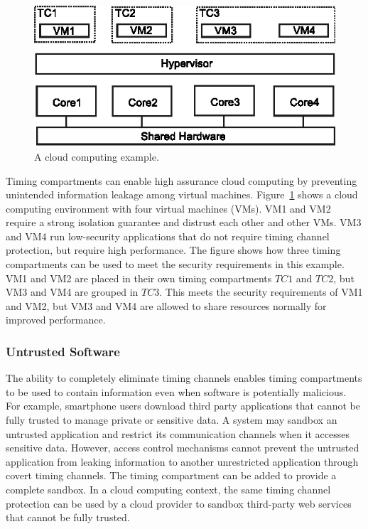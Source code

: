 \begin{figure}
    \begin{center}
        \includegraphics{figs/cloud_tcs.eps}
        \caption{A cloud computing example.} %
        \label{fig:cloud_tcs}
        \vspace{-0.2in}
    \end{center}
\end{figure}

Timing compartments can enable high assurance cloud computing by preventing
unintended information leakage among virtual machines.
Figure~\ref{fig:cloud_tcs} shows a cloud computing environment with four virtual 
machines (VMs).
VM1 and VM2 require a strong isolation guarantee and distrust each other and 
other VMs.
VM3 and VM4 run low-security applications that do not require timing channel 
protection, but require high performance. The figure shows how three timing 
compartments can be used to meet the security requirements in this example.
VM1 and VM2 are placed in their own timing compartments $TC1$ and $TC2$, but VM3 
and VM4 are grouped in $TC3$. 
This meets the 
security requirements of VM1 and VM2, but VM3 and VM4 are allowed to share 
resources normally for improved performance.


\subsubsection{Untrusted Software} 

The ability to completely eliminate timing channels enables timing compartments
to be used to contain information even when software is potentially malicious.
For example, smartphone users download third party applications
that cannot be fully trusted to manage private or sensitive data. A system may
sandbox an untrusted application and restrict its communication channels
when it accesses sensitive data. However, access control mechanisms cannot
prevent the untrusted application from leaking information to another 
unrestricted
application through covert timing channels. The timing compartment can 
be added to provide a complete sandbox.  In a cloud computing
context, the same timing channel protection can be used
by a cloud provider to sandbox third-party web services that cannot be fully 
trusted.

